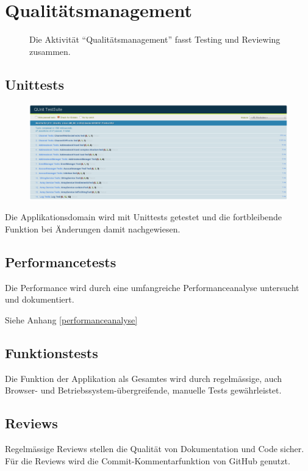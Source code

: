 \chapter{Qualitätsmanagement}
	\begin{figure}[H]
		\centering
		{\tiny
		}
		\caption{Die Aktivität ``Qualitätsmanagement'' fasst Testing und Reviewing
		zusammen.}
	\end{figure}


	\section{Unittests}		
		\begin{figure}[H]
			\centering
			\includegraphics[width=1\textwidth]{../qualityManagement/unittesting.png}
			\label{unittests}
		\end{figure}
		Die Applikationsdomain wird mit Unittests getestet und die fortbleibende
		Funktion bei Änderungen damit nachgewiesen.
		
	\section{Performancetests}
		Die Performance wird durch eine umfangreiche Performanceanalyse untersucht und dokumentiert.
		
		Siehe Anhang \ref{performanceanalyse}
		
	\section{Funktionstests}
		Die Funktion der Applikation als Gesamtes wird durch regelmässige, auch
		Browser- und Betriebssystem-übergreifende, manuelle Tests gewährleistet.
		
	\section{Reviews}
		Regelmässige Reviews stellen die Qualität von Dokumentation und Code sicher. Für die Reviews wird die Commit-Kommentarfunktion von GitHub genutzt.

